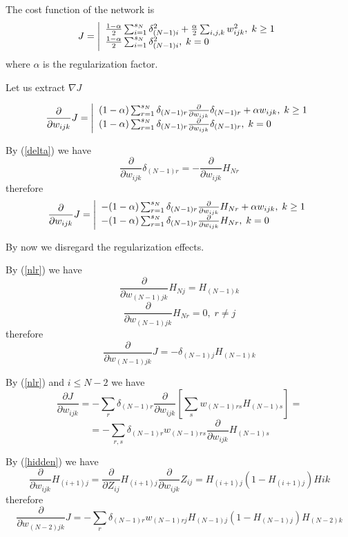 \documentclass[a4paper,11pt]{article}
\begin{document}
The cost function of the network is
\[
  J=\left|
    \begin{array}l
      \frac{1 - \alpha}{2} \sum_{i=1}^{s_N} \delta_{(N-1)i}^2 + \frac{\alpha}{2}\sum_{i,j,k} w_{ijk}^2, \; k \ge 1
      \\
      \frac{1 - \alpha}{2} \sum_{i=1}^{s_N} \delta_{(N-1)i}^2,\; k=0
    \end{array}
  \right.
\]
where $ \alpha $ is the regularization factor.

Let us extract $ \nabla J $

\[
	\frac{\partial}{\partial w_{ijk}} J = \left|
    \begin{array}l
		(1 - \alpha) \sum_{r=1}^{s_N} \delta_{(N-1)r} \frac{\partial}{\partial w_{ijk}}  \delta_{(N-1)r} + \alpha w_{ijk}, \; k \ge 1
	      \\
		(1 - \alpha)\sum_{r=1}^{s_N} \delta_{(N-1)r} \frac{\partial }{\partial w_{ijk}}\delta_{(N-1)r}, \; k =0
    \end{array}
  \right.
\]

By (\ref{delta}) we have
\[
	\frac{\partial}{\partial w_{ijk}} \delta_{(N-1)r} = 
	-\frac{\partial}{\partial w_{ijk}} H_{Nr}
\]
therefore
\[
	\frac{\partial}{\partial w_{ijk}} J =\left|
    \begin{array}l
		-(1 - \alpha) \sum_{r=1}^{s_N} \delta_{(N-1)r} \frac{\partial}{\partial w_{ijk}} H_{Nr} + \alpha w_{ijk}, \; k \ge 1
	      \\
		-(1 - \alpha)\sum_{r=1}^{s_N} \delta_{(N-1)r} \frac{\partial}{\partial w_{ijk}} H_{Nr}, \; k =0
    \end{array}
  \right.
\]

By now we disregard the regularization effects.

By (\ref{nlr}) we have
\[
	\frac{\partial}{\partial w_{(N-1)jk}}  H_{Nj} = H_{(N-1)k}
\]
\[
	\frac{\partial}{\partial w_{(N-1)jk}}  H_{Nr} = 0, \; r \ne j
\]
therefore
\[
	\frac{\partial}{\partial w_{(N-1)jk}} J =
		- \delta_{(N-1)j} H_{(N-1)k}
\]

By (\ref{nlr}) and $ i \le N - 2  $ we have
\[
	\frac{\partial J}{\partial w_{ijk}} =
	 - \sum_r \delta_{(N-1)r} \frac{\partial}{\partial w_{ijk}} \left[ \sum_s w_{(N-1)rs} H_{(N-1)s} \right] =
\]
\[
	= - \sum_{r,s} \delta_{(N-1)r} w_{(N-1)rs} \frac{\partial}{\partial w_{ijk}} H_{(N-1)s}
\]

By (\ref{hidden}) we have
\[
	\frac{\partial}{\partial w_{ijk}} H_{(i+1)j} =
	\frac{\partial}{\partial Z_{ij}} H_{(i+1)j} 
	\frac{\partial}{\partial w_{ijk}} Z_{ij} =
	H_{(i+1)j} (1 - H_{(i+1)j}) Hik
\]
therefore
\[
	\frac{\partial}{\partial w_{(N-2)jk}} J =
	- \sum_r \delta_{(N-1)r} w_{(N-1)rj}
	H_{(N-1)j} (1 - H_{(N-1)j}) H_{(N-2)k}
\]
\end{document}
